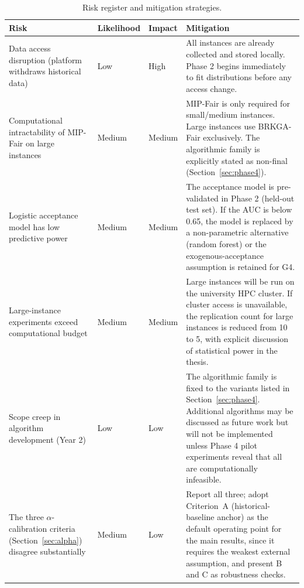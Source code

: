 \documentclass[12pt,a4paper]{report}
\begin{document}
\begin{table}[ht]
\centering
\caption{Risk register and mitigation strategies.}
\label{tab:risks}
\small
\begin{tabularx}{\textwidth}{p{3.5cm}p{1.8cm}p{1.5cm}p{7.2cm}}
\toprule
\textbf{Risk} & \textbf{Likelihood} & \textbf{Impact} & \textbf{Mitigation} \\
\midrule
    Data access disruption (platform withdraws historical data) & Low & High & All instances are already collected and stored locally. Phase 2 begins immediately to fit distributions before any access change. \\
\midrule
    Computational intractability of MIP-Fair on large instances & Medium & Medium &
    MIP-Fair is only required for small/medium instances. Large instances use BRKGA-Fair exclusively. The algorithmic family is explicitly stated as non-final (Section~\ref{sec:phase4}). \\
\midrule
    Logistic acceptance model has low predictive power & Medium & Medium &
    The acceptance model is pre-validated in Phase 2 (held-out test set). If the AUC is below 0.65, the model is replaced by a non-parametric alternative (random forest) or the exogenous-acceptance assumption is retained for G4. \\
\midrule
    Large-instance experiments exceed computational budget & Medium & Medium & Large instances will be run on the university HPC cluster. If cluster access is
    unavailable, the replication count for large instances is reduced from 10 to 5, with explicit discussion of statistical power in the thesis. \\
\midrule
    Scope creep in algorithm development (Year 2) & Low & Low & The algorithmic family is fixed to the variants listed in Section~\ref{sec:phase4}. Additional algorithms may be discussed as
    future work but will not be implemented unless Phase 4 pilot experiments reveal that all are computationally infeasible. \\
\midrule
    The three $\alpha$-calibration criteria (Section~\ref{sec:alpha}) disagree substantially & Medium & Low & Report all three; adopt Criterion~A (historical-baseline anchor) as the default operating point for the main results, since it requires the weakest external assumption, and present B and C as robustness checks. \\
\bottomrule
\end{tabularx}
\end{table}

\FloatBarrier
\end{document}
